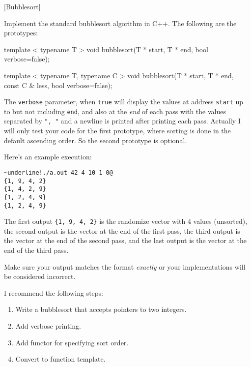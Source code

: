 [Bubblesort]

Implement the standard bubblesort algorithm in C++.
The following are the prototypes:
\begin{console}[frame=single, fontsize=\footnotesize]
template < typename T >
void bubblesort(T * start, T * end, bool verbose=false);

template < typename T, typename C >
void bubblesort(T * start, T * end, const C & less, bool verbose=false);
\end{console}
The \verb!verbose! parameter, when \verb!true! will
display the values at address \verb!start! up to but not including \verb!end!,
and also at the \textit{end} of each pass with the values
separated by \verb!", "! and
a newline is printed after printing each pass.
Actually I will only test your code for the first prototype, where
sorting is done in the default ascending order.
So the second prototype is optional.

Here's an example execution:
\begin{Verbatim}[frame=single,commandchars=\~\!\@,fontsize=\footnotesize]
~underline!./a.out 42 4 10 1 0@
{1, 9, 4, 2}
{1, 4, 2, 9}
{1, 2, 4, 9}
{1, 2, 4, 9}
\end{Verbatim}
The first output \verb!{1, 9, 4, 2}! is the randomize vector with 4
values (unsorted),
the second output is the vector at the end of the first pass,
the third output is the vector at the end of the second pass, and the
last output is the vector at the end of the third pass.

Make sure your output matches the format \textit{exactly}
or your implementations will be considered incorrect.

I recommend the following steps:
\begin{enumerate}[nosep]
\item Write a bubblesort that accepts pointers to two integers.
\item Add verbose printing.
\item Add functor for specifying sort order.
\item Convert to function template.
\end{enumerate}

